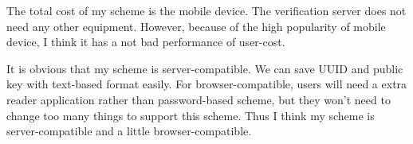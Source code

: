 \begin{CJK}{Bg5}{bsmi}
The total cost of my scheme is the mobile device. The verification server does not need any other equipment. However, because of the high popularity of mobile device, I think it has a not bad performance of user-cost.

It is obvious that my scheme is server-compatible. We can save UUID and public key with text-based format easily. For browser-compatible, users will need a extra reader application rather than password-based scheme, but they won't need to change too many things to support this scheme. Thus I think my scheme is server-compatible and a little browser-compatible. 

\end{CJK}